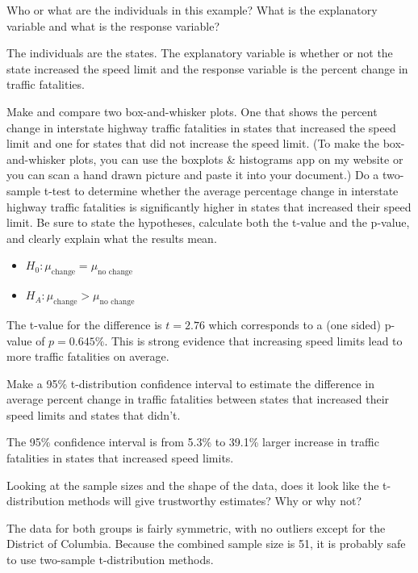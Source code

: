 \documentclass[12pt]{exam}
\begin{document}
\begin{questions}

\question Who or what are the individuals in this example? What is the explanatory variable and what is the response variable? 
\begin{solution}
The individuals are the states.  The explanatory variable is whether or not the state increased the speed limit and the response variable is the percent change in traffic fatalities.
\end{solution}
\question  Make and compare two box-and-whisker plots.  One that shows the percent change in interstate highway traffic fatalities in states that increased the speed limit and one for states that did not increase the speed limit. (To make the box-and-whisker plots, you can use the boxplots \& histograms app on my website or you can scan a hand drawn picture and paste it into your document.) 
\question  Do a two-sample t-test to determine whether the average percentage change in interstate
highway traffic fatalities is significantly higher in states that increased their speed limit.  Be sure to state the hypotheses, calculate both the t-value and the p-value, and clearly explain what the results mean.
\begin{solution}
\begin{itemize}
\item $H_0: \mu_\text{change} = \mu_\text{no change}$ \\
\item $H_A: \mu_\text{change} > \mu_\text{no change}$ 
\end{itemize}
The t-value for the difference is $t = 2.76$ which corresponds to a (one sided) p-value of $p = 0.645\%$. This is strong evidence that increasing speed limits lead to more traffic fatalities on average. 
\end{solution}
\question Make a 95\% t-distribution confidence interval to estimate the difference in average percent change in traffic fatalities between states that increased their speed limits and states that didn't.
\begin{solution}
The 95\% confidence interval is from 5.3\% to 39.1\% larger increase in traffic fatalities in states that increased speed limits. 
\end{solution}
\question Looking at the sample sizes and the shape of the data, does it look like the t-distribution methods will give trustworthy estimates? Why or why not?
\begin{solution}
The data for both groups is fairly symmetric, with no outliers except for the District of Columbia.  Because the combined sample size is 51, it is probably safe to use two-sample t-distribution methods.  

\end{solution}
\end{questions}
\end{document}
